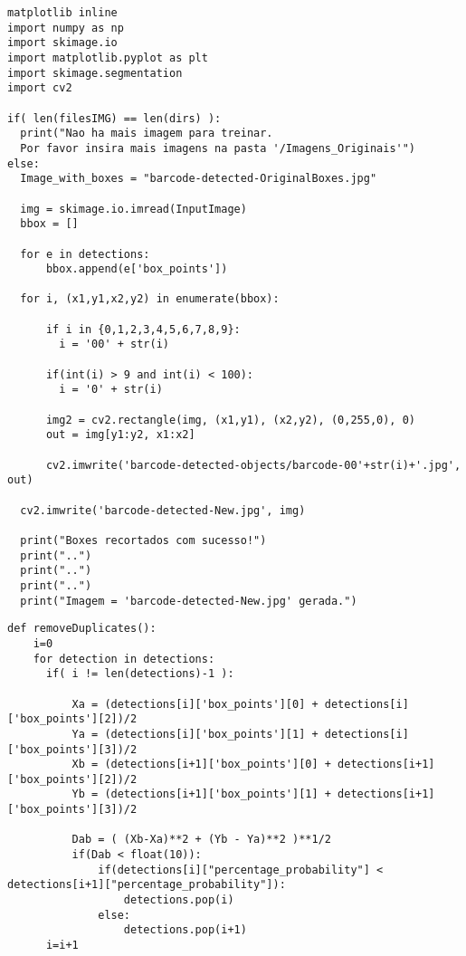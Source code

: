 \begin{lstlisting}[caption=Recorte das \textit{bounding box} e exportação para uma pasta tags-images]
matplotlib inline
import numpy as np
import skimage.io
import matplotlib.pyplot as plt
import skimage.segmentation
import cv2

if( len(filesIMG) == len(dirs) ):
  print("Nao ha mais imagem para treinar. 
  Por favor insira mais imagens na pasta '/Imagens_Originais'")
else:
  Image_with_boxes = "barcode-detected-OriginalBoxes.jpg"

  img = skimage.io.imread(InputImage)
  bbox = []

  for e in detections:
      bbox.append(e['box_points'])

  for i, (x1,y1,x2,y2) in enumerate(bbox):

      if i in {0,1,2,3,4,5,6,7,8,9}:
        i = '00' + str(i)
      
      if(int(i) > 9 and int(i) < 100):
        i = '0' + str(i)

      img2 = cv2.rectangle(img, (x1,y1), (x2,y2), (0,255,0), 0)
      out = img[y1:y2, x1:x2]

      cv2.imwrite('barcode-detected-objects/barcode-00'+str(i)+'.jpg', out)

  cv2.imwrite('barcode-detected-New.jpg', img)

  print("Boxes recortados com sucesso!")
  print("..")
  print("..")
  print("..")
  print("Imagem = 'barcode-detected-New.jpg' gerada.")
\end{lstlisting}

\newpage
\begin{lstlisting}[caption=Função para fazer a diferença entre distância dos números para deletar o de menor Acurácia]
def removeDuplicates():
    i=0
    for detection in detections:
      if( i != len(detections)-1 ):
          
          Xa = (detections[i]['box_points'][0] + detections[i]['box_points'][2])/2
          Ya = (detections[i]['box_points'][1] + detections[i]['box_points'][3])/2
          Xb = (detections[i+1]['box_points'][0] + detections[i+1]['box_points'][2])/2
          Yb = (detections[i+1]['box_points'][1] + detections[i+1]['box_points'][3])/2

          Dab = ( (Xb-Xa)**2 + (Yb - Ya)**2 )**1/2
          if(Dab < float(10)):
              if(detections[i]["percentage_probability"] < detections[i+1]["percentage_probability"]):
                  detections.pop(i)
              else:
                  detections.pop(i+1)
      i=i+1
\end{lstlisting}

